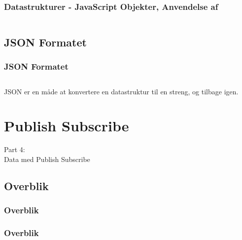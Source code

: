 \begin{frame}
    \frametitle{Datastrukturer - JavaScript Objekter, Anvendelse af}
    \vspace{-1mm}
    \inputminted[fontsize=\footnotesize]{javascript}{../src/frontend/part3_object/logic.js}
\end{frame}

\subsection{JSON Formatet}
\begin{frame}
    \frametitle{JSON Formatet}
    \vspace{-1mm}
    \inputminted[fontsize=\footnotesize,highlightlines={1}]{javascript}{../src/frontend/part3_json/logic.js}
    
    \pause
    \vspace{1mm}
    JSON er en måde at konvertere en datastruktur til en streng, og tilbage igen.
\end{frame}

\section{Publish Subscribe}
\begin{frame}
    \vspace{25mm}
    \begin{center}
        \Huge{Part 4:\\Data med Publish Subscribe}
    \end{center}
\end{frame}

\subsection{Overblik}
\begin{frame}
    \frametitle{Overblik}
    \vspace{10mm}
    \begin{center}
    \end{center}
\end{frame}
\begin{frame}
    \frametitle{Overblik}
    \vspace{10mm}
    \begin{center}
    \end{center}
\end{frame}

